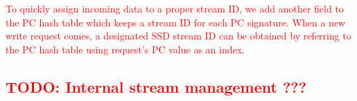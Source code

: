 \textcolor{red}{To quickly assign incoming data to a proper stream ID, we add
another field to the PC hash table which keeps a stream ID for each PC
signature.  When a new write request comes, a designated SSD stream ID can be
obtained by referring to the PC hash table using request's PC value as an
index.  }


\subsection{\textcolor{red}{TODO: Internal stream management ???}}




